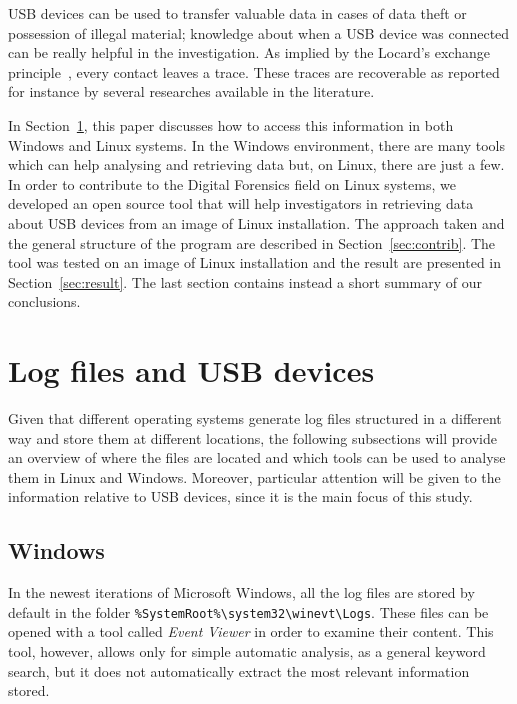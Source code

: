 \documentclass[a4paper]{article}
\begin{document}
USB devices can be used to transfer valuable data in cases of data theft or
possession of illegal material; knowledge about when a USB device was connected
can be really helpful in the investigation. As implied by the Locard's exchange
principle~\cite{locard2008locard}, every contact leaves a trace. These traces are
recoverable as reported for instance by several researches available in the
literature.~\cite{Tanushree12,Abhijeet14}

In Section~\ref{sec:lit}, this paper discusses how to access this information in
both Windows and Linux systems. In the Windows environment, there are many tools
which can help analysing and retrieving data but, on Linux, there are just a
few. In order to contribute to the Digital Forensics field on Linux systems, we
developed an open source tool that will help investigators in retrieving data
about USB devices from an image of Linux installation. The approach taken and
the general structure of the program are described in Section~\ref{sec:contrib}.
The tool was tested on an image of Linux installation and the result are
presented in Section~\ref{sec:result}. The last section contains instead a short
summary of our conclusions.

\section{Log files and USB devices}
\label{sec:lit}

Given that different operating systems generate log files structured in a
different way and store them at different locations, the following subsections
will provide an overview of where the files are located and which tools can
be used to analyse them in Linux and Windows. Moreover, particular attention
will be given to the information relative to USB devices, since it is the main
focus of this study.

\subsection{Windows}\label{sec:litWindows}
In the newest iterations of Microsoft Windows, all the log files are stored by
default in the folder
\texttt{\%SystemRoot\%\textbackslash{}system32\textbackslash{}winevt\textbackslash{}Logs}.
These files can be opened with a tool called \emph{Event Viewer} in order to
examine their content. This tool, however, allows only for simple automatic
analysis, as a general keyword search, but it does not automatically extract
the most relevant information stored.
\end{document}
